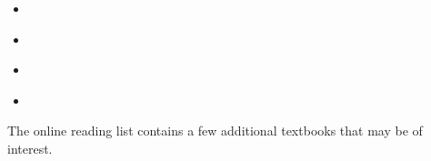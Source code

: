 \documentclass[a4paper,12pt]{article}
\begin{document}
\begin{itemize}
	\item \citet{rawlings2023integrating}
	\item \citet{borgatti2024analyzing}
	\item \citet{kolaczyk2020statistical}
	\item \citet{wasserman1994social}
\end{itemize}
The online reading list contains a few additional textbooks that may be of interest.



\end{document}
